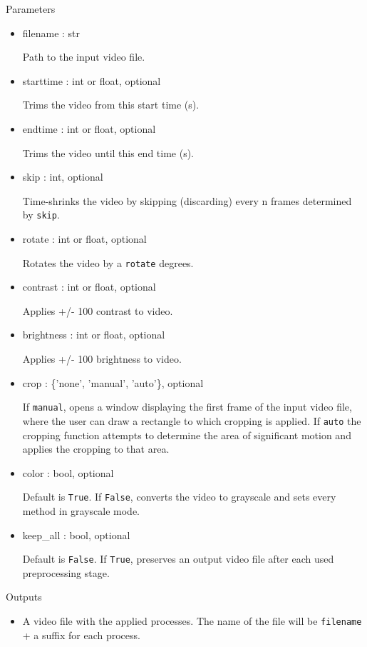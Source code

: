 \documentclass[9pt]{extarticle}
\def\code#1{\texttt{#1}}
\begin{document}
\noindent Parameters
\begin{itemize}
\item filename : str

Path to the input video file.

\item starttime : int or float, optional

Trims the video from this start time (s).

\item endtime : int or float, optional

Trims the video until this end time (s).

\item skip : int, optional

Time-shrinks the video by skipping (discarding) every n 
frames determined by \code{skip}.

\item rotate : int or float, optional

Rotates the video by a \code{rotate} degrees.

\item contrast : int or float, optional

Applies +/- 100 contrast to video.

\item brightness : int or float, optional

Applies +/- 100 brightness to video.

\item crop : \{'none', 'manual', 'auto'\}, optional

If \code{manual}, opens a window displaying the first frame of the 
input video file, where the user can draw a rectangle to which 
cropping is applied. If \code{auto} the cropping function attempts to 
determine the area of significant motion and applies the cropping 
to that area.

\item color : bool, optional

Default is \code{True}. If \code{False}, converts the video to 
grayscale and sets every method in grayscale mode.

\item keep\_all : bool, optional

Default is \code{False}. If \code{True}, preserves an output 
video file after each used preprocessing stage.
\end{itemize}

\noindent Outputs
\begin{itemize}
\item A video file with the applied processes. The name of the file 
will be \code{filename} + a suffix for each process.
\end{itemize}
\end{document}
